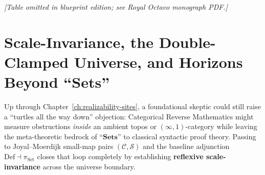 \begin{remark}
\end{remark}

\begin{center}\emph{[Table omitted in blueprint edition; see Royal Octavo monograph PDF.]}\label{tab:master-ast-ledger}\end{center}

\section{Scale-Invariance, the Double-Clamped Universe, and Horizons Beyond ``$\mathbf{Sets}$''}\label{sec:scale-invariance-synthesis}

Up through Chapter~\ref{ch:realizability-sites}, a foundational skeptic could still raise a ``turtles all the way down'' objection: Categorical Reverse Mathematics might measure obstructions \emph{inside} an ambient topos or $(\infty, 1)$-category while leaving the meta-theoretic bedrock of ``$\mathbf{Sets}$'' to classical syntactic proof theory. Passing to Joyal--Moerdijk small-map pairs $(\mathcal{C}, \mathcal{S})$ and the baseline adjunction $\mathrm{Def} \dashv \pi_{\mathrm{Set}}$ closes that loop completely by establishing \textbf{reflexive scale-invariance} across the universe boundary.

